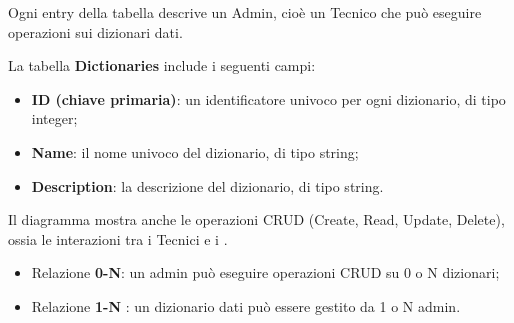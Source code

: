 \vspace{0.5\baselineskip}
\par Ogni entry della tabella descrive un Admin, cioè un Tecnico che può eseguire operazioni  sui dizionari dati.

\par La tabella \textbf{Dictionaries} include i seguenti campi:
\begin{itemize}
    \item \textbf{ID (chiave primaria)}: un identificatore univoco per ogni dizionario, di tipo integer;
    \item \textbf{Name}: il nome univoco del dizionario, di tipo string;
    \item \textbf{Description}: la descrizione del dizionario, di tipo string.
\end{itemize}

Il diagramma mostra anche le operazioni CRUD (Create, Read, Update, Delete), ossia le interazioni tra i Tecnici e i .

\begin{itemize}
      \item Relazione \textbf{0-N}: un admin può eseguire operazioni CRUD su 0 o N dizionari;
    \item Relazione \textbf{1-N} : un dizionario dati può essere gestito da 1 o N admin.
\end{itemize}